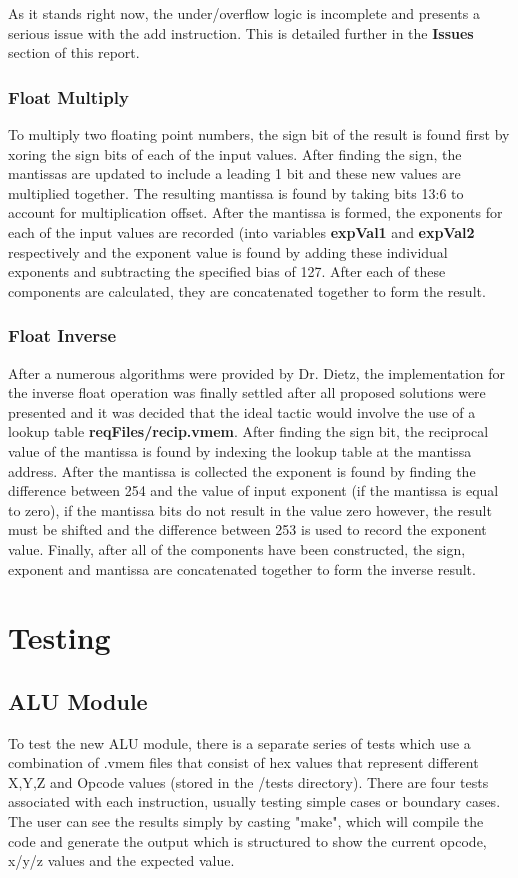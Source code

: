 \documentclass[conference]{IEEEtran}
\begin{document}
As it stands right now, the under/overflow logic is incomplete and presents a serious issue with the add instruction. This is detailed further in the \textbf{Issues} section of this report.


\subsubsection{Float Multiply}
To multiply two floating point numbers, the sign bit of the result is found first by xoring the sign bits of each
of the input values. After finding the sign, the mantissas are updated to include a leading 1 bit and these 
new values are multiplied together. The resulting mantissa is found by taking bits 13:6 to account for 
multiplication offset. After the mantissa is formed, the exponents for each of the input values are recorded
(into variables \textbf{expVal1} and \textbf{expVal2} respectively and the exponent value is found by
 adding these individual exponents and subtracting the specified bias of 127. After each of these components are calculated, they are concatenated together to form the result. 

\subsubsection{Float Inverse}
After a numerous algorithms were provided by Dr. Dietz, the implementation for the 
inverse float operation was finally settled after all proposed solutions were presented
and it was decided that the ideal tactic would involve the use of a lookup 
table \textbf{reqFiles/recip.vmem}. After finding the sign bit, the reciprocal value of the mantissa
is found by indexing the lookup table at the mantissa address. After the mantissa is collected
the exponent is found by finding the difference between 254 and the value of input exponent (if 
the mantissa is equal to zero), if the mantissa bits do not result in the value zero however, the 
result must be shifted and the difference between 253 is used to record the exponent value.
Finally, after all of the components have been constructed, the sign, exponent and mantissa
are concatenated together to form the inverse result. 
 


\section{Testing}

\subsection{ALU Module}
To test the new ALU module, there is a separate series of tests which use a combination of .vmem files
that consist of hex values that represent different X,Y,Z and Opcode values (stored in the /tests directory). 
There are four tests associated with each instruction, usually testing simple cases or boundary cases. 
The user can see the results simply by casting "make", which will compile the code and generate the 
output which is structured to show the current opcode, x/y/z values and the expected value. 
\end{document}
